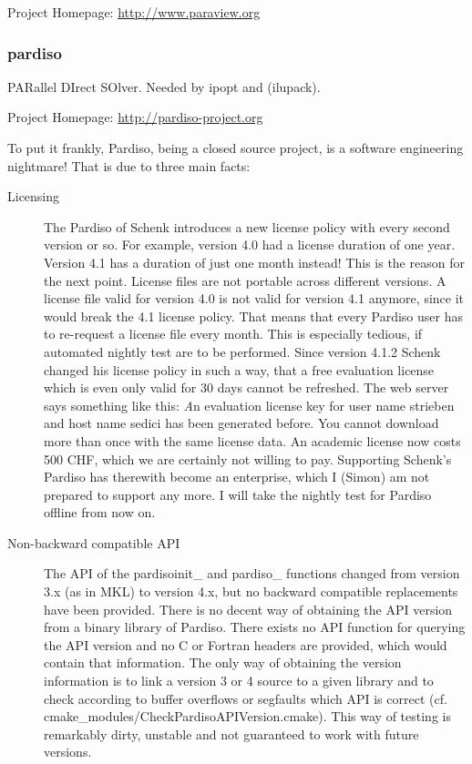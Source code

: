 \noindent Project Homepage: \url{http://www.paraview.org}

\subsubsection{pardiso}  PARallel DIrect  SOlver\cite{Schenk2004, Schenk2006a,
Schenk2006b, Schenk2007}. Needed by ipopt and (ilupack).

\noindent Project Homepage: \url{http://pardiso-project.org}

To put it frankly, Pardiso, being a closed source project, is a software engineering nightmare! That is due to three main facts:

\begin{description}
  \item[Licensing]
    \subitem The Pardiso of Schenk introduces a new license policy with every second version or so. For example, version 4.0 had a license duration of one year. Version 4.1 has a duration of just one month instead! This is the reason for the next point.
    \subitem License files are not portable across different versions. A license file valid for version 4.0 is not valid for version 4.1 anymore, since it would break the 4.1 license policy. That means that every Pardiso user has to re-request a license file every month. This is especially tedious, if automated nightly test are to be performed.
    \subitem Since version 4.1.2 Schenk changed his license policy in such a way, that a free evaluation license which is even only valid for 30 days cannot be refreshed. The web server says something like this: {\emph An evaluation license key for user name strieben and host name sedici has been generated before.
You cannot download more than once with the same license data.} An academic license now costs 500 CHF, which we are certainly not willing to pay. Supporting Schenk's Pardiso has therewith become an enterprise, which I (Simon) am not prepared to support any more. I will take the nightly test for Pardiso offline from now on.
  \item[Non-backward compatible API]
    \subitem The API of the pardisoinit\_ and pardiso\_ functions changed from version 3.x (as in MKL) to version 4.x, but no backward compatible replacements have been provided.
    \subitem There is no decent way of obtaining the API version from a binary library of Pardiso. There exists no API function for querying the API version and no C or Fortran headers are provided, which would contain that information.
    \subitem The only way of obtaining the version information is to link a version 3 or 4 source to a given library and to check according to buffer overflows or segfaults which API is correct (cf. cmake\_modules/CheckPardisoAPIVersion.cmake). This way of testing is remarkably dirty, unstable and not guaranteed to work with future versions.

\end{description}
